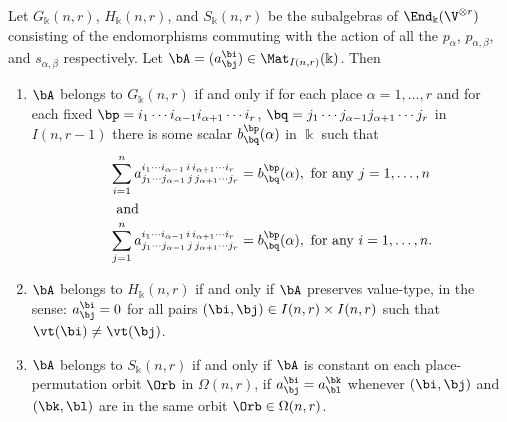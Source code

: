 \begin{prop}\label{prop:GHS}
 Let $G_\Bbbk(n,r)$, $H_\Bbbk(n,r)$, and $S_\Bbbk(n,r)$ be the
 subalgebras of $\End_\Bbbk( \V^{\otimes r} )$ consisting of
 the endomorphisms commuting with the action of all the $p_\alpha$,
 $p_{\alpha,\beta}$, and $s_{\alpha,\beta}$ respectively. Let $\bA =
 ( a^{\bi}_{\bj} ) \in \Mat_{I(n,r)}(\Bbbk)$. Then
\begin{enumerate}[label=(\alph*)]
\item\label{prop3.2_a} $\bA$ belongs to $G_\Bbbk(n,r)$ if and only if for each place
 $\alpha = 1, \dots, r$ and for each fixed $\bp = i_1 \cdots
 i_{\alpha-1} i_{\alpha+1}\cdots i_r$, $\bq = j_1 \cdots j_{\alpha-1}
 j_{\alpha+1} \cdots j_r$ in $I(n,r-1)$ there is some scalar
 $b^\bp_\bq(\alpha)$ in $\Bbbk$ such that
 \begin{align*}
 \sum_{i = 1}^n a^{i_1 \cdots i_{\alpha-1}\, i\, i_{\alpha+1}
 \cdots i_r}_{j_1 \cdots j_{\alpha-1}\, j\, j_{\alpha+1} \cdots
 j_r} &= b^\bp_\bq(\alpha), \text{ for any } j = 1, \dots, n
 \\ \intertext{ and} \sum_{j = 1}^n a^{i_1 \cdots i_{\alpha-1}\,
 i\, i_{\alpha+1} \cdots i_r}_{j_1 \cdots j_{\alpha-1}\, j\,
 j_{\alpha+1} \cdots j_r} &= b^\bp_\bq(\alpha), \text{ for any }
 i = 1, \dots, n.
 \end{align*}

\item\label{prop3.2_b} $\bA$ belongs to $H_\Bbbk(n,r)$ if and only if $\bA$ preserves
 value-type, in the sense: $a^{\bi}_{\bj} = 0$ for all pairs
 $(\bi,\bj) \in I(n,r) \times I(n,r)$ such that $\vt(\bi) \ne
 \vt(\bj)$.
 
\item\label{prop3.2_c} $\bA$ belongs to $S_\Bbbk(n,r)$ if and only if $\bA$ is constant
 on each place-permutation orbit $\Orb$ in $\Omega(n,r)$, \ie if
 $a^\bi_\bj = a^\bk_\bl$ whenever $(\bi,\bj)$ and $(\bk,\bl)$ are in
 the same orbit $\Orb \in \Omega(n,r)$.
\end{enumerate}
\end{prop}

